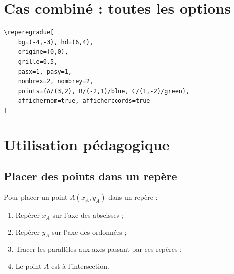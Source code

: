 \documentclass[11pt,a4paper]{article}
\begin{document}
\begin{center}
\end{center}

\section{Cas combiné : toutes les options}

\begin{verbatim}
\reperegradue[
    bg=(-4,-3), hd=(6,4),
    origine=(0,0),
    grille=0.5,
    pasx=1, pasy=1,
    nombrex=2, nombrey=2,
    points={A/(3,2), B/(-2,1)/blue, C/(1,-2)/green},
    affichernom=true, affichercoords=true
]
\end{verbatim}

\begin{center}
\reperegradue[
    bg={(-4,-3)}, hd={(6,4)},
    origine={(0,0)},
    grille=0.5,
    pasx=1, pasy=1,
    nombrex=2, nombrey=2,
    points={A/(3,2), B/(-2,1)/blue, C/(1,-2)/green},
    affichernom=true, affichercoords=true
]
\end{center}

\section{Utilisation pédagogique}

\subsection{Placer des points dans un repère}

\begin{methode}
    Pour placer un point $A(x_A, y_A)$ dans un repère :
    \begin{enumerate}
        \item Repérer $x_A$ sur l'axe des abscisses ;
        \item Repérer $y_A$ sur l'axe des ordonnées ;
        \item Tracer les parallèles aux axes passant par ces repères ;
        \item Le point $A$ est à l'intersection.
    \end{enumerate}
\end{methode}
\end{document}

